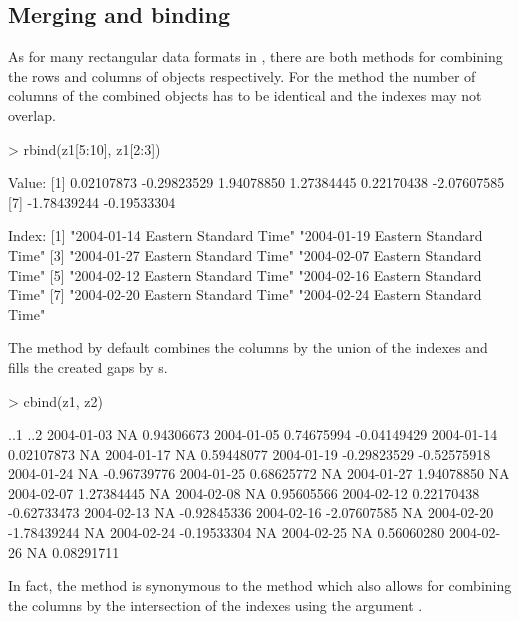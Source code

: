 \documentclass{Z}
\begin{document}
\subsection{Merging and binding}
\label{sec:merge}

As for many rectangular data formats in , there are
both methods for combining the rows and columns of 
objects respectively. For the  method the number of
columns of the combined objects has to be identical and the
indexes may not overlap.
\begin{Schunk}
\begin{Sinput}
> rbind(z1[5:10], z1[2:3])
\end{Sinput}
\begin{Soutput}
Value:
[1]  0.02107873 -0.29823529  1.94078850  1.27384445  0.22170438 -2.07607585
[7] -1.78439244 -0.19533304

Index:
[1] "2004-01-14 Eastern Standard Time" "2004-01-19 Eastern Standard Time"
[3] "2004-01-27 Eastern Standard Time" "2004-02-07 Eastern Standard Time"
[5] "2004-02-12 Eastern Standard Time" "2004-02-16 Eastern Standard Time"
[7] "2004-02-20 Eastern Standard Time" "2004-02-24 Eastern Standard Time"
\end{Soutput}
\end{Schunk}
The  method by default combines the columns by the union of
the indexes and fills the created gaps by s.
\begin{Schunk}
\begin{Sinput}
> cbind(z1, z2)
\end{Sinput}
\begin{Soutput}
           ..1         ..2        
2004-01-03          NA  0.94306673
2004-01-05  0.74675994 -0.04149429
2004-01-14  0.02107873          NA
2004-01-17          NA  0.59448077
2004-01-19 -0.29823529 -0.52575918
2004-01-24          NA -0.96739776
2004-01-25  0.68625772          NA
2004-01-27  1.94078850          NA
2004-02-07  1.27384445          NA
2004-02-08          NA  0.95605566
2004-02-12  0.22170438 -0.62733473
2004-02-13          NA -0.92845336
2004-02-16 -2.07607585          NA
2004-02-20 -1.78439244          NA
2004-02-24 -0.19533304          NA
2004-02-25          NA  0.56060280
2004-02-26          NA  0.08291711
\end{Soutput}
\end{Schunk}
In fact, the  method is synonymous to the 
method which also allows for combining the columns by the intersection
of the indexes using the argument .
\end{document}
